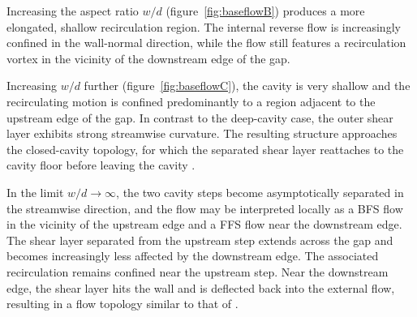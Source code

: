 \documentclass[lineno]{jfm}
\begin{document}
Increasing the aspect ratio $w/d$ (figure~\ref{fig:baseflowB}) produces a more elongated, shallow recirculation region. The internal reverse flow is increasingly confined in the wall-normal direction, while the flow still features a recirculation vortex in the vicinity of the downstream edge of the gap.

Increasing $w/d$ further (figure~\ref{fig:baseflowC}), the cavity is very shallow and the recirculating motion is confined predominantly to a region adjacent to the upstream edge of the gap. In contrast to the deep-cavity case, the outer shear layer exhibits strong streamwise curvature. The resulting structure approaches the closed-cavity topology, for which the separated shear layer reattaches to the cavity floor before leaving the cavity \citep{Zhang2005}.

In the limit $w/d\to\infty$, the two cavity steps become asymptotically separated in the streamwise direction, and the flow may be interpreted locally as a \ac{BFS} flow in the vicinity of the upstream edge and a \ac{FFS} flow near the downstream edge. The shear layer separated from the upstream step extends across the gap and becomes increasingly less affected by the downstream edge. The associated recirculation remains confined near the upstream step. Near the downstream edge, the shear layer hits the wall and is deflected back into the external flow, resulting in a flow topology similar to that of .
\end{document}
